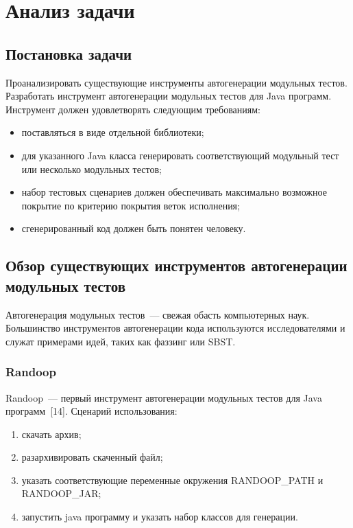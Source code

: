 \chapter{Анализ  задачи} 

\section{Постановка задачи}

Проанализировать существующие инструменты автогенерации модульных тестов. Разработать инструмент автогенерации модульных тестов для Java программ. Инструмент должен удовлетворять следующим требованиям:

\begin{itemize}
	\item поставляться в виде отдельной библиотеки;
	\item для указанного Java класса генерировать соответствующий модульный тест или несколько модульных тестов;
	\item набор тестовых сценариев должен обеспечивать максимально возможное покрытие по критерию покрытия веток исполнения;
	\item сгенерированный код должен быть понятен человеку.
\end{itemize}


\section{Обзор существующих инструментов автогенерации модульных тестов}

Автогенерация модульных тестов~--- свежая обасть компьютерных наук. Большинство инструментов автогенерации кода используются исследователями и служат примерами идей, таких как фаззинг или SBST. 

\subsection{Randoop}

Randoop~--- первый инструмент автогенерации модульных тестов для Java программ~[14]. Сценарий использования: 

\begin{enumerate}
	\item скачать архив;
	\item разархивировать скаченный файл;
	\item указать соответствующие переменные окружения RANDOOP\_PATH и RANDOOP\_JAR;
	\item запустить java программу и указать набор классов для генерации.
\end{enumerate}

